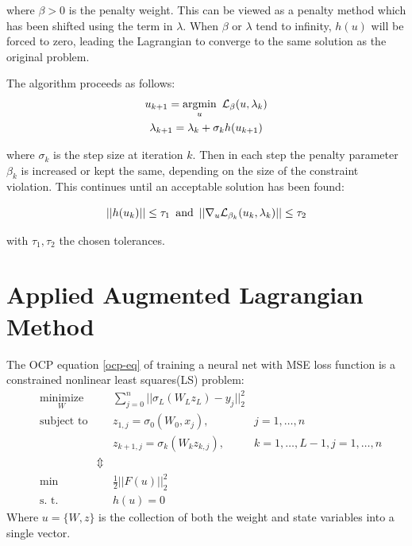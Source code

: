 where $\beta>0$ is the penalty weight. This can be viewed as a penalty method which has been shifted using the term in $\lambda$\cite{Birgin2009}. When $\beta$ or $\lambda$ tend to infinity, $h(u)$ will be forced to zero, leading the Lagrangian to converge to the same solution as the original problem.

The algorithm proceeds as follows:
\begin{gather*}
	u_{k+1} = \underset{u}{\text{argmin}} \hspace{.5em} \mathcal{L}_\beta(u,\lambda_k) \\
	\lambda_{k+1} = \lambda_k + \sigma_k h(u_{k+1})
\end{gather*}

where $\sigma_k$ is the step size at iteration $k$. Then in each step the penalty parameter $\beta_k$ is increased or kept the same, depending on the size of the constraint violation. This continues until an acceptable solution has been found:

\begin{equation}
	||h(u_k)|| \leq \tau_1 \hspace{.5em}\text{and}\hspace{.5em} ||\nabla_u\mathcal{L}_{\beta_k}(u_k,\lambda_k)|| \leq \tau_2
\end{equation}

with $\tau_1,\tau_2$ the chosen tolerances.

\section{Applied Augmented Lagrangian Method}

The OCP equation \ref{ocp-eq} of training a neural net with MSE loss function is a constrained nonlinear least squares(LS) problem:
\begin{equation*}
	\begin{aligned}
	& \underset{W}{\text{minimize}}
	& & \sum\limits_{j=0}^{n}||\sigma_L(W_Lz_L) - y_j||^2_2 \\
	& \text{subject to}
	& & z_{1,j} = \sigma_0(W_0,x_j), &j = 1,\ldots,n \\
	& & & z_{k+1,j} = \sigma_k(W_kz_{k,j}), &k = 1,\ldots,L-1,j = 1,\ldots,n \\
    & & \Updownarrow \\
	& \text{min}
	&  & \frac{1}{2} ||F(u)||^2_2 \\
	& \text{s. t.}
	& &  h(u) = 0
	\end{aligned}
\end{equation*}
Where $u = \{W,z\}$ is the collection of both the weight and state variables into a single vector.

